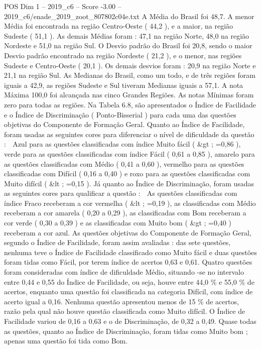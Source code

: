 \begin{textsample}{POS Dim 1 – 2019\_c6 – Score -3.00 – 2019\_c6/enade\_2019\_zoot\_807802c04e.txt}
A Média do Brasil foi 48,7.
A menor Média foi encontrada na região Centro-Oeste ( 44,2 ), e a maior, na região Sudeste ( 51,1 ).
As demais Médias foram : 47,1 na região Norte, 48,0 na região Nordeste e 51,0 na região Sul.
O Desvio padrão do Brasil foi 20,8, sendo o maior Desvio padrão encontrado na região Nordeste ( 21,2 ), e o menor, nas regiões Sudeste e Centro-Oeste ( 20,1 ).
Os demais desvios foram : 20,9 na região Norte e 21,1 na região Sul.
As Medianas do Brasil, como um todo, e de três regiões foram iguais a 42,9, as regiões Sudeste e Sul tiveram Medianas iguais a 57,1.
A nota Máxima 100,0 foi alcançada nas cinco Grandes Regiões.
As notas Mínimas foram zero para todas as regiões.
Na Tabela 6.8, são apresentados o Índice de Facilidade e o Índice de Discriminação ( Ponto-Bisserial ) para cada uma das questões objetivas do Componente de Formação Geral.
Quanto ao Índice de Facilidade, foram usadas as seguintes cores para diferenciar o nível de dificuldade da questão :  Azul para as questões classificadas com índice Muito fácil ( \&gt ; =0,86 ), verde para as questões classificadas com índice Fácil ( 0,61 a 0,85 ), amarelo para as questões classificadas com Médio ( 0,41 a 0,60 ), vermelho para as questões classificadas com Difícil ( 0,16 a 0,40 ) e roxo para as questões classificadas com Muito difícil ( \&lt ; =0,15 ).
Já quanto ao Índice de Discriminação, foram usadas as seguintes cores para qualificar a questão :  As questões classificadas com índice Fraco receberam a cor vermelha ( \&lt ; =0,19 ), as classificadas com Médio receberam a cor amarela ( 0,20 a 0,29 ), as classificadas com Bom receberam a cor verde ( 0,30 a 0,39 ) e as classificadas com Muito bom ( \&gt ; =0,40 ) receberam a cor azul.
As questões objetivas do Componente de Formação Geral, segundo o Índice de Facilidade, foram assim avaliadas : das sete questões, nenhuma teve o Índice de Facilidade classificado como Muito fácil e duas questões foram tidas como Fácil, por terem índice de acertos 0,63 e 0,61.
Quatro questões foram consideradas com índice de dificuldade Médio, situando -se no intervalo entre 0,44 e 0,55 do Índice de Facilidade, ou seja, houve entre 44,0 \% e 55,0 \% de acertos, enquanto uma questão foi classificada na categoria Difícil, com índice de acerto igual a 0,16.
Nenhuma questão apresentou menos de 15 \% de acertos, razão pela qual não houve questão classificada como Muito difícil.
O Índice de Facilidade variou de 0,16 a 0,63 e o de Discriminação, de 0,32 a 0,49.
Quase todas as questões, quanto ao Índice de Discriminação, foram tidas como Muito bom ; apenas uma questão foi tida como Bom.

\end{textsample}
